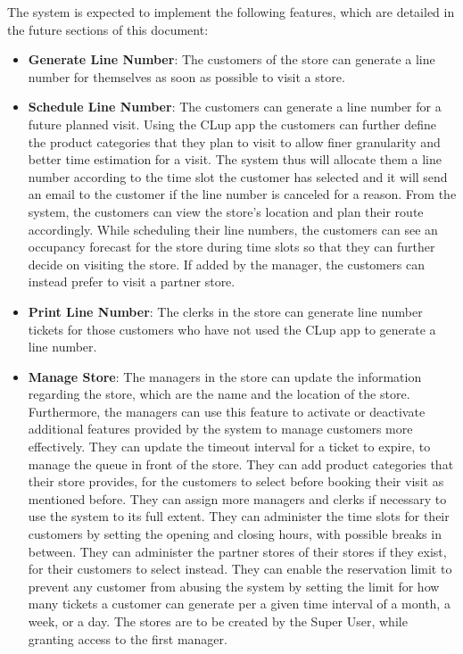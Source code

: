 The system is expected to implement the following features, which are detailed in the future sections of this document: \\
\begin{itemize}
    \item \textbf{Generate Line Number}: The customers of the store can generate a line number for themselves as soon as possible to visit a store.
    \item \textbf{Schedule Line Number}: The customers can generate a line number for a future planned visit.
    Using the CLup app the customers can further define the product categories that they plan to visit to allow finer granularity and better time estimation for a visit.
    The system thus will allocate them a line number according to the time slot the customer has selected and it will send an email to the customer if the line number is canceled for a reason.
    From the system, the customers can view the store's location and plan their route accordingly.
     While scheduling their line numbers, the customers can see an occupancy forecast for the store during time slots so that they can further decide on visiting the store.
    If added by the manager, the customers can instead prefer to visit a partner store.
    \item \textbf{Print Line Number}: The clerks in the store can generate line number tickets for those customers who have not used the CLup app to generate a line number.
    \item \textbf{Manage Store}: The managers in the store can update the information regarding the store, which are the name and the location of the store.
    Furthermore, the managers can use this feature to activate or deactivate additional features provided by the system to manage customers more effectively.
    They can update the timeout interval for a ticket to expire, to manage the queue in front of the store.
    They can add product categories that their store provides, for the customers to select before booking their visit as mentioned before.
    They can assign more managers and clerks if necessary to use the system to its full extent.
    They can administer the time slots for their customers by setting the opening and closing hours, with possible breaks in between.
    They can administer the partner stores of their stores if they exist, for their customers to select instead.
    They can enable the reservation limit to prevent any customer from abusing the system by setting the limit for how many tickets a customer can generate per a given time interval of a month, a week, or a day.
    The stores are to be created by the Super User, while granting access to the first manager.
\end{itemize}


